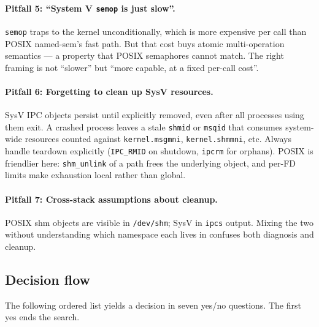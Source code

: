 \documentclass[a4paper,11pt]{article}
\begin{document}
\paragraph{Pitfall 5: ``System V \texttt{semop} is just slow''.}
\texttt{semop} traps to the kernel unconditionally, which is more
expensive per call than POSIX named-sem's fast path. But that cost
buys atomic multi-operation semantics --- a property that POSIX
semaphores cannot match. The right framing is not ``slower'' but
``more capable, at a fixed per-call cost''.

\paragraph{Pitfall 6: Forgetting to clean up SysV resources.}
SysV IPC objects persist until explicitly removed, even after all
processes using them exit. A crashed process leaves a stale
\texttt{shmid} or \texttt{msqid} that consumes system-wide
resources counted against \texttt{kernel.msgmni},
\texttt{kernel.shmmni}, etc. Always handle teardown explicitly
(\texttt{IPC\_RMID} on shutdown, \texttt{ipcrm} for orphans).
POSIX is friendlier here: \texttt{shm\_unlink} of a path frees the
underlying object, and per-FD limits make exhaustion local rather
than global.

\paragraph{Pitfall 7: Cross-stack assumptions about cleanup.}
POSIX shm objects are visible in \texttt{/dev/shm}; SysV in
\texttt{ipcs} output. Mixing the two without understanding which
namespace each lives in confuses both diagnosis and cleanup.

\subsection{Decision flow}
\label{sec:guidance:flow}

The following ordered list yields a decision in seven yes/no
questions. The first yes ends the search.
\end{document}
